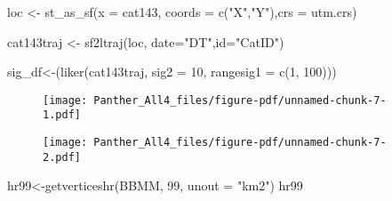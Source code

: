 \documentclass[
  letterpaper,
]{book}
\newenvironment{Shaded}{\begin{snugshade}}{\end{snugshade}}
\newcommand{\AttributeTok}[1]{\textcolor[rgb]{0.40,0.45,0.13}{#1}}
\newcommand{\DecValTok}[1]{\textcolor[rgb]{0.68,0.00,0.00}{#1}}
\newcommand{\FunctionTok}[1]{\textcolor[rgb]{0.28,0.35,0.67}{#1}}
\newcommand{\NormalTok}[1]{\textcolor[rgb]{0.00,0.23,0.31}{#1}}
\newcommand{\OtherTok}[1]{\textcolor[rgb]{0.00,0.23,0.31}{#1}}
\newcommand{\SpecialCharTok}[1]{\textcolor[rgb]{0.37,0.37,0.37}{#1}}
\newcommand{\StringTok}[1]{\textcolor[rgb]{0.13,0.47,0.30}{#1}}
\begin{document}
\begin{Shaded}
\begin{Highlighting}[]
\NormalTok{loc }\OtherTok{\textless{}{-}} \FunctionTok{st\_as\_sf}\NormalTok{(}\AttributeTok{x =}\NormalTok{ cat143, }\AttributeTok{coords =} \FunctionTok{c}\NormalTok{(}\StringTok{"X"}\NormalTok{,}\StringTok{"Y"}\NormalTok{),}\AttributeTok{crs =}\NormalTok{ utm.crs)}

\NormalTok{cat143traj }\OtherTok{\textless{}{-}} \FunctionTok{sf2ltraj}\NormalTok{(loc, }\AttributeTok{date=}\StringTok{"DT"}\NormalTok{,}\AttributeTok{id=}\StringTok{"CatID"}\NormalTok{)}

\NormalTok{sig\_df}\OtherTok{\textless{}{-}}\NormalTok{(}\FunctionTok{liker}\NormalTok{(cat143traj, }\AttributeTok{sig2 =} \DecValTok{10}\NormalTok{, }\AttributeTok{rangesig1 =} \FunctionTok{c}\NormalTok{(}\DecValTok{1}\NormalTok{, }\DecValTok{100}\NormalTok{)))}
\end{Highlighting}
\end{Shaded}

\begin{figure}[H]

{\centering \texttt{[image: Panther\_All4\_files/figure-pdf/unnamed-chunk-7-1.pdf]}

}

\end{figure}

\begin{Shaded}
\end{Shaded}

\begin{figure}[H]

{\centering \texttt{[image: Panther\_All4\_files/figure-pdf/unnamed-chunk-7-2.pdf]}

}

\end{figure}

\begin{Shaded}
\begin{Highlighting}[]
\NormalTok{hr99}\OtherTok{\textless{}{-}}\FunctionTok{getverticeshr}\NormalTok{(BBMM, }\DecValTok{99}\NormalTok{, }\AttributeTok{unout =} \StringTok{"km2"}\NormalTok{)}
\NormalTok{hr99}
\end{Highlighting}
\end{Shaded}
\end{document}

